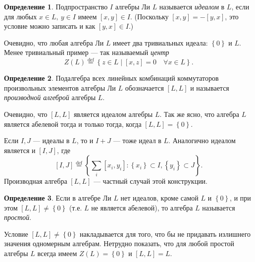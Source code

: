 \documentclass[a4paper, 12pt]{article}
\theoremstyle{definition}
\newtheorem{definition}{Определение}[section]
\begin{document}
\begin{definition}
    Подпространство \({ I }\) алгебры Ли \({ L }\) называется \textit{идеалом} в \({ L }\), если для любых \({ x \in L,\: y \in I }\) имеем \({ [x, y] \in I }\). (Поскольку \({ [x, y] = -[y, x] }\), это условие можно записать и как \({ [y, x] \in I }\).)
\end{definition}

Очевидно, что любая алгебра Ли \({ L }\) имеет два тривиальных идеала: \({ \left\{ 0 \right\} }\) и \({ L }\). Менее тривиальный пример --- так называемый \textit{центр}
\[
    Z(L) \overset{\text{def}}= \left\{ z \in L \mid [x, z] = 0 \quad \forall x \in L \right\}.
\]

\begin{definition}
    Подалгебра всех линейных комбинаций коммутаторов произвольных элементов алгебры Ли \({ L }\) обозначается \({ [L, L] }\) и называется \textit{производной алгеброй} алгебры \({ L }\).
\end{definition}

Очевидно, что \({ [L, L] }\) является идеалом алгебры \({ L }\). Так же ясно, что алгебра \({ L }\) является абелевой тогда и только тогда, когда \({ [L, L] = \left\{ 0 \right\} }\).

Если \({ I, J }\) --- идеалы в \({ L }\), то и \({ I + J }\) --- тоже идеал в \({ L }\). Аналогично идеалом является и \({ [I, J] }\), где
\[
    [I, J] \overset{\text{def}}= \left\{ \sum_i [x_i, y_i] : \left\{ x_i \right\} \subset I, \left\{ y_i \right\} \subset J \right\}.
\]
Производная алгебра \({ [L, L] }\) --- частный случай этой конструкции.

\begin{definition}
    Если в алгебре Ли \({ L }\) нет идеалов, кроме самой \({ L }\) и \({ \left\{ 0 \right\} }\), и при этом \({ [L, L] \neq \left\{ 0 \right\} }\) (т.е. \({ L }\) не является абелевой), то алгебра \({ L }\) называется \textit{простой}.
\end{definition}

Условие \({ [L, L] \neq \left\{ 0 \right\} }\) накладывается для того, что бы не придавать излишнего значения одномерным алгебрам. Нетрудно показать, что для любой простой алгебры \({ L }\) всегда имеем \({ Z(L) = \left\{ 0 \right\} }\) и \({ [L, L] = L }\).
\end{document}
